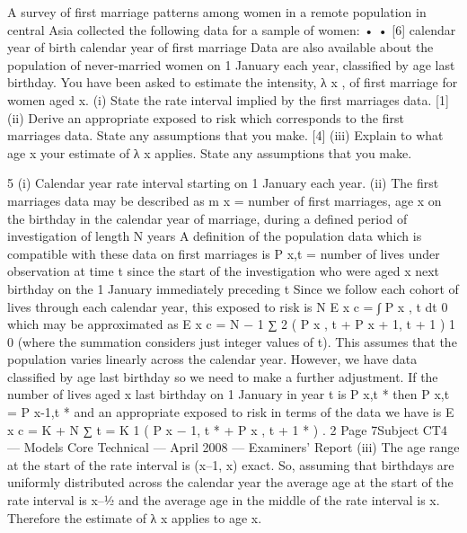 \documentclass[a4paper,12pt]{article}
\begin{document}
A survey of first marriage patterns among women in a remote population in central
Asia collected the following data for a sample of women:
•
•
[6]
calendar year of birth
calendar year of first marriage
Data are also available about the population of never-married women on 1 January
each year, classified by age last birthday.
You have been asked to estimate the intensity, λ x , of first marriage for women
aged x.
(i) State the rate interval implied by the first marriages data. [1]
(ii) Derive an appropriate exposed to risk which corresponds to the first
marriages data. State any assumptions that you make. [4]
(iii)
Explain to what age x your estimate of λ x applies. State any assumptions
that you make.


5
(i) Calendar year rate interval starting on 1 January each
year.
(ii) The first marriages data may be described as
m x = number of first marriages, age x on the birthday in the
calendar year of marriage, during a defined period of investigation of
length N years
A definition of the population data which is compatible with these data on first
marriages is
P x,t = number of lives under observation at time t since the start of the
investigation who were aged x next birthday on the 1 January
immediately preceding t
Since we follow each cohort of lives through each calendar year, this exposed
to risk is
N
E x c
=
∫ P x , t dt
0
which may be approximated as
E x c =
N − 1
∑ 2 ( P x , t + P x + 1, t + 1 )
1
0
(where the summation considers just integer values of t).
This assumes that the population varies linearly across the
calendar year.
However, we have data classified by age last birthday
so we need to make a further adjustment.
If the number of lives aged x last birthday on 1 January
in year t is P x,t * then
P x,t = P x-1,t *
and an appropriate exposed to risk in terms of the data we
have is
E x c =
K + N
∑
t = K
1
( P x − 1, t * + P x , t + 1 * ) .
2
Page 7Subject CT4 — Models Core Technical — April 2008 — Examiners’ Report
(iii)
The age range at the start of the rate interval is (x–1, x)
exact.
So, assuming that birthdays are uniformly distributed
across the calendar year the average age at the start of the rate interval is
x–1⁄2 and the average age in the middle of the rate interval
is x.
Therefore the estimate of λ x applies to age x.
\end{document}
